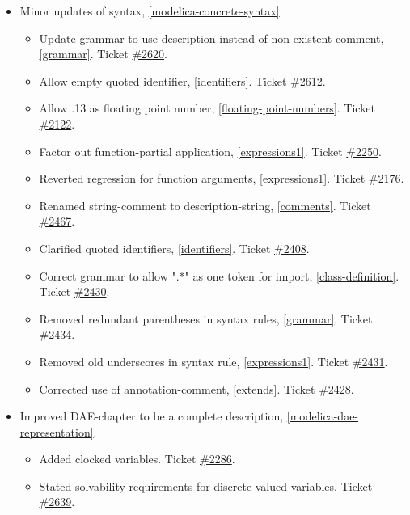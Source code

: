 \begin{itemize}
\item Minor updates of syntax, \cref{modelica-concrete-syntax}.
\begin{itemize}
\item Update grammar to use description instead of non-existent comment, \cref{grammar}.
Ticket \href{https://github.com/modelica/ModelicaSpecification/pull/2620}{\#2620}.
\item Allow empty quoted identifier, \cref{identifiers}.
Ticket \href{https://github.com/modelica/ModelicaSpecification/issues/2612}{\#2612}.
\item Allow .13 as floating point number, \cref{floating-point-numbers}.
Ticket \href{https://github.com/modelica/ModelicaSpecification/issues/2122}{\#2122}.
\item Factor out function-partial application, \cref{expressions1}.
Ticket \href{https://github.com/modelica/ModelicaSpecification/issues/2250}{\#2250}.
\item Reverted regression for function arguments, \cref{expressions1}.
Ticket \href{https://github.com/modelica/ModelicaSpecification/issues/2176}{\#2176}.
\item Renamed string-comment to description-string, \cref{comments}.
Ticket \href{https://github.com/modelica/ModelicaSpecification/pull/2467}{\#2467}.
\item Clarified quoted identifiers, \cref{identifiers}.
Ticket \href{https://github.com/modelica/ModelicaSpecification/issues/2408}{\#2408}.
\item Correct grammar to allow ".*" as one token for import, \cref{class-definition}.
Ticket \href{https://github.com/modelica/ModelicaSpecification/issues/2430}{\#2430}.
\item Removed redundant parentheses in syntax rules, \cref{grammar}.
Ticket \href{https://github.com/modelica/ModelicaSpecification/issues/2434}{\#2434}.
\item Removed old underscores in syntax rule, \cref{expressions1}.
Ticket \href{https://github.com/modelica/ModelicaSpecification/issues/2431}{\#2431}.
\item Corrected use of annotation-comment, \cref{extends}.
Ticket \href{https://github.com/modelica/ModelicaSpecification/pull/2428}{\#2428}.
\end{itemize}

\item Improved DAE-chapter to be a complete description, \cref{modelica-dae-representation}.
\begin{itemize}
\item Added clocked variables.
Ticket \href{https://github.com/modelica/ModelicaSpecification/issues/2286}{\#2286}.
\item Stated solvability requirements for discrete-valued variables.
Ticket \href{https://github.com/modelica/ModelicaSpecification/issues/2639}{\#2639}.
\end{itemize}


\end{itemize}
